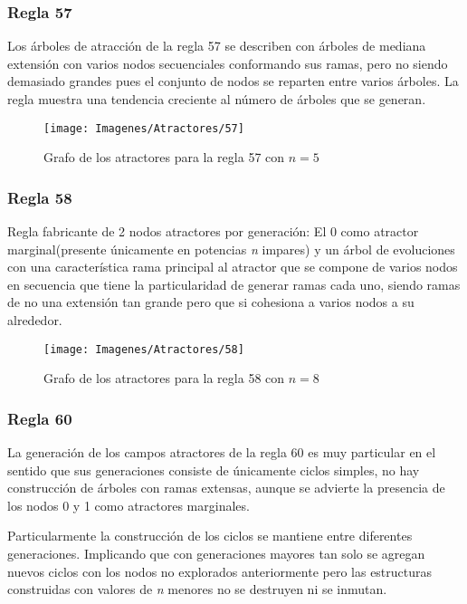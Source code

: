 \documentclass[]{article}
\begin{document}
			\newpage
			\subsubsection{Regla 57}
				\justifying
				Los árboles de atracción de la regla 57 se describen con árboles de mediana extensión con varios nodos secuenciales conformando sus ramas, pero no siendo demasiado grandes pues el conjunto de nodos se reparten entre varios árboles. La regla muestra una tendencia creciente al número de árboles que se generan.
				
				\hfill\break
				\hfill\break
				\begin{figure}[!h]
					\centering
					\texttt{[image: Imagenes/Atractores/57]}
					\caption{Grafo de los atractores para la regla 57 con $n=5$}
					\label{Regla_57}
				\end{figure}
			
			\newpage
			\subsubsection{Regla 58}
				\justifying
				Regla fabricante de 2 nodos atractores por generación: El 0 como atractor marginal(presente únicamente en potencias \textit{n} impares) y un árbol de evoluciones con una característica rama principal al atractor que se compone de varios nodos en secuencia que tiene la particularidad de generar ramas cada uno, siendo ramas de no una extensión tan grande pero que si cohesiona a varios nodos a su alrededor.
				
				\hfill\break
				\hfill\break
				\begin{figure}[!h]
					\centering
					\texttt{[image: Imagenes/Atractores/58]}
					\caption{Grafo de los atractores para la regla 58 con $n=8$}
					\label{Regla_58}
				\end{figure}
				
			
			\newpage
			\subsubsection{Regla 60}
				\justifying
				La generación de los campos atractores de la regla 60 es muy particular en el sentido que sus generaciones consiste de únicamente ciclos simples, no hay construcción de árboles con ramas extensas, aunque se advierte la presencia de los nodos 0 y 1 como atractores marginales.
				
				\hfill\break
				\justifying
				Particularmente la construcción de los ciclos se mantiene entre diferentes generaciones. Implicando que con generaciones mayores tan solo se agregan nuevos ciclos con los nodos no explorados anteriormente pero las estructuras construidas con valores de \textit{n} menores no se destruyen ni se inmutan.
				
\end{document}
